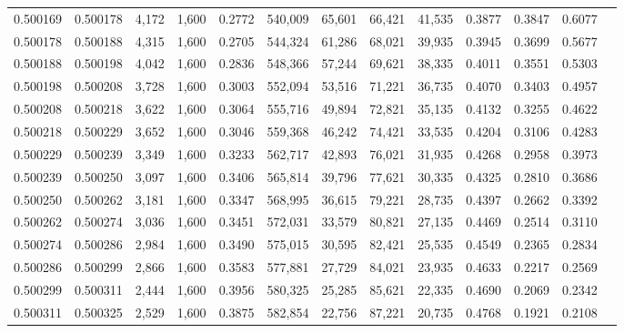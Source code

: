 \begin{tabular}{rrrrrrrrrrrrr}
0.500169 & 0.500178 &  4,172 & 1,600 &                                     0.2772 & 540,009 &  65,601 &  66,421 &  41,535 & 0.3877 & 0.3847 & 0.6077 \\
0.500178 & 0.500188 &  4,315 & 1,600 &                                     0.2705 & 544,324 &  61,286 &  68,021 &  39,935 & 0.3945 & 0.3699 & 0.5677 \\
0.500188 & 0.500198 &  4,042 & 1,600 &                                     0.2836 & 548,366 &  57,244 &  69,621 &  38,335 & 0.4011 & 0.3551 & 0.5303 \\
0.500198 & 0.500208 &  3,728 & 1,600 &                                     0.3003 & 552,094 &  53,516 &  71,221 &  36,735 & 0.4070 & 0.3403 & 0.4957 \\
0.500208 & 0.500218 &  3,622 & 1,600 &                                     0.3064 & 555,716 &  49,894 &  72,821 &  35,135 & 0.4132 & 0.3255 & 0.4622 \\
0.500218 & 0.500229 &  3,652 & 1,600 &                                     0.3046 & 559,368 &  46,242 &  74,421 &  33,535 & 0.4204 & 0.3106 & 0.4283 \\
0.500229 & 0.500239 &  3,349 & 1,600 &                                     0.3233 & 562,717 &  42,893 &  76,021 &  31,935 & 0.4268 & 0.2958 & 0.3973 \\
0.500239 & 0.500250 &  3,097 & 1,600 &                                     0.3406 & 565,814 &  39,796 &  77,621 &  30,335 & 0.4325 & 0.2810 & 0.3686 \\
0.500250 & 0.500262 &  3,181 & 1,600 &                                     0.3347 & 568,995 &  36,615 &  79,221 &  28,735 & 0.4397 & 0.2662 & 0.3392 \\
0.500262 & 0.500274 &  3,036 & 1,600 &                                     0.3451 & 572,031 &  33,579 &  80,821 &  27,135 & 0.4469 & 0.2514 & 0.3110 \\
0.500274 & 0.500286 &  2,984 & 1,600 &                                     0.3490 & 575,015 &  30,595 &  82,421 &  25,535 & 0.4549 & 0.2365 & 0.2834 \\
0.500286 & 0.500299 &  2,866 & 1,600 &                                     0.3583 & 577,881 &  27,729 &  84,021 &  23,935 & 0.4633 & 0.2217 & 0.2569 \\
0.500299 & 0.500311 &  2,444 & 1,600 &                                     0.3956 & 580,325 &  25,285 &  85,621 &  22,335 & 0.4690 & 0.2069 & 0.2342 \\
0.500311 & 0.500325 &  2,529 & 1,600 &                                     0.3875 & 582,854 &  22,756 &  87,221 &  20,735 & 0.4768 & 0.1921 & 0.2108 \\

\end{tabular}
